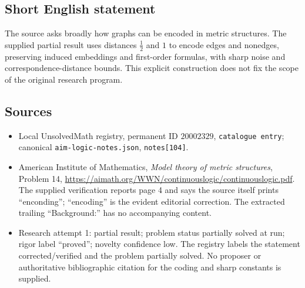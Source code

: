 \documentclass[11pt]{article}
\begin{document}
\subsection{Short English statement}
The source asks broadly how graphs can be encoded in metric structures. The supplied partial result uses distances $\tfrac12$ and $1$ to encode edges and nonedges, preserving induced embeddings and first-order formulas, with sharp noise and correspondence-distance bounds. This explicit construction does not fix the scope of the original research program.
\subsection{Sources}
\begin{itemize}
\item Local UnsolvedMath registry, permanent ID $20002329$, \texttt{catalogue entry}; canonical \texttt{aim-logic-notes.json}, \texttt{notes[104]}.
\item American Institute of Mathematics, \emph{Model theory of metric structures}, Problem 14, \url{https://aimath.org/WWN/continuouslogic/continuouslogic.pdf}. The supplied verification reports page 4 and says the source itself prints ``enconding''; ``encoding'' is the evident editorial correction. The extracted trailing ``Background:'' has no accompanying content.
\item Research attempt 1: partial result; problem status partially solved at run; rigor label ``proved''; novelty confidence low. The registry labels the statement corrected/verified and the problem partially solved. No proposer or authoritative bibliographic citation for the coding and sharp constants is supplied.
\end{itemize}
\end{document}
